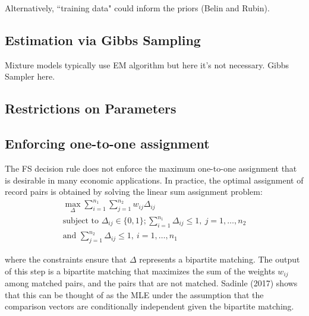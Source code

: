 \documentclass[11pt,reqno]{amsart}
\begin{document}
Alternatively, ``training data" could inform the priors (Belin and Rubin). %
 
\subsection{Estimation via Gibbs Sampling} 

Mixture models typically use EM algorithm but here it's not necessary.  Gibbs Sampler here. 

\subsection{Restrictions on Parameters}
\subsection{Enforcing one-to-one assignment}

The FS decision rule does not enforce the maximum one-to-one assignment that is desirable in many economic applications.  In practice, the optimal assignment of record pairs is obtained by solving the linear sum assignment problem: 
\begin{gather*}
\max_{\Delta} \sum_{i=1}^{n_1}\sum_{j=1}^{n_2} w_{ij} \Delta_{ij}\\
\text{subject to } \Delta_{ij} \in \{0,1\}; \sum_{i=1}^{n_1} \Delta_{ij} \leq 1, \ j=1, \dots, n_2 \\ \text{and } \sum_{j=1}^{n_2} \Delta_{ij} \leq 1, \ i=1, \dots, n_1 
\end{gather*} 

where the constraints ensure that $\Delta$ represents a bipartite matching.  The output of this step is a bipartite matching that maximizes the sum of the weights $w_{ij}$ among matched pairs, and the pairs that are not matched.  Sadinle (2017) shows that this can be thought of as the MLE under the assumption that the comparison vectors are conditionally independent given the bipartite matching. %
\end{document}
